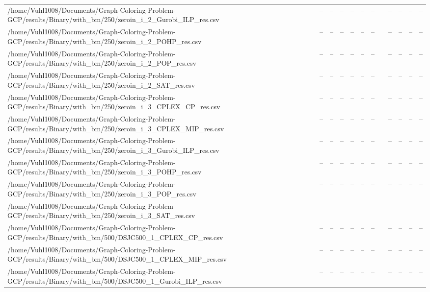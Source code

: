 \begin{table}[htbp]
\begin{tabular}{llllllllllll}
/home/Vuhl1008/Documents/Graph-Coloring-Problem-GCP/results/Binary/with\_bm/250/zeroin\_i\_2\_Gurobi\_ILP\_res.csv & -- & -- & -- & -- & -- & -- & {} & -- & -- & -- & -- \\
/home/Vuhl1008/Documents/Graph-Coloring-Problem-GCP/results/Binary/with\_bm/250/zeroin\_i\_2\_POHP\_res.csv & -- & -- & -- & -- & -- & -- & {} & -- & -- & -- & -- \\
/home/Vuhl1008/Documents/Graph-Coloring-Problem-GCP/results/Binary/with\_bm/250/zeroin\_i\_2\_POP\_res.csv & -- & -- & -- & -- & -- & -- & {} & -- & -- & -- & -- \\
/home/Vuhl1008/Documents/Graph-Coloring-Problem-GCP/results/Binary/with\_bm/250/zeroin\_i\_2\_SAT\_res.csv & -- & -- & -- & -- & -- & -- & {} & -- & -- & -- & -- \\
/home/Vuhl1008/Documents/Graph-Coloring-Problem-GCP/results/Binary/with\_bm/250/zeroin\_i\_3\_CPLEX\_CP\_res.csv & -- & -- & -- & -- & -- & -- & {} & -- & -- & -- & -- \\
/home/Vuhl1008/Documents/Graph-Coloring-Problem-GCP/results/Binary/with\_bm/250/zeroin\_i\_3\_CPLEX\_MIP\_res.csv & -- & -- & -- & -- & -- & -- & {} & -- & -- & -- & -- \\
/home/Vuhl1008/Documents/Graph-Coloring-Problem-GCP/results/Binary/with\_bm/250/zeroin\_i\_3\_Gurobi\_ILP\_res.csv & -- & -- & -- & -- & -- & -- & {} & -- & -- & -- & -- \\
/home/Vuhl1008/Documents/Graph-Coloring-Problem-GCP/results/Binary/with\_bm/250/zeroin\_i\_3\_POHP\_res.csv & -- & -- & -- & -- & -- & -- & {} & -- & -- & -- & -- \\
/home/Vuhl1008/Documents/Graph-Coloring-Problem-GCP/results/Binary/with\_bm/250/zeroin\_i\_3\_POP\_res.csv & -- & -- & -- & -- & -- & -- & {} & -- & -- & -- & -- \\
/home/Vuhl1008/Documents/Graph-Coloring-Problem-GCP/results/Binary/with\_bm/250/zeroin\_i\_3\_SAT\_res.csv & -- & -- & -- & -- & -- & -- & {} & -- & -- & -- & -- \\
/home/Vuhl1008/Documents/Graph-Coloring-Problem-GCP/results/Binary/with\_bm/500/DSJC500\_1\_CPLEX\_CP\_res.csv & -- & -- & -- & -- & -- & -- & {} & -- & -- & -- & -- \\
/home/Vuhl1008/Documents/Graph-Coloring-Problem-GCP/results/Binary/with\_bm/500/DSJC500\_1\_CPLEX\_MIP\_res.csv & -- & -- & -- & -- & -- & -- & {} & -- & -- & -- & -- \\
/home/Vuhl1008/Documents/Graph-Coloring-Problem-GCP/results/Binary/with\_bm/500/DSJC500\_1\_Gurobi\_ILP\_res.csv & -- & -- & -- & -- & -- & -- & {} & -- & -- & -- & -- \\

\end{tabular}
\end{table}
